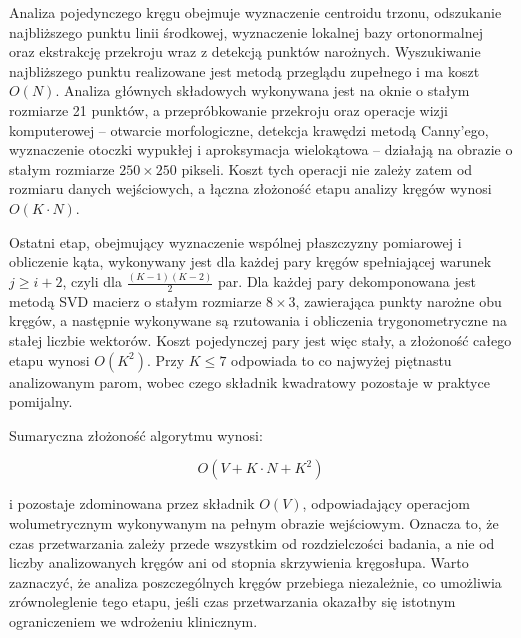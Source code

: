 Analiza pojedynczego kręgu obejmuje wyznaczenie centroidu trzonu, odszukanie najbliższego punktu linii środkowej, wyznaczenie lokalnej bazy ortonormalnej oraz ekstrakcję przekroju wraz z detekcją punktów narożnych.
Wyszukiwanie najbliższego punktu realizowane jest metodą przeglądu zupełnego i ma koszt $O(N)$.
Analiza głównych składowych wykonywana jest na oknie o stałym rozmiarze 21 punktów, a przepróbkowanie przekroju oraz operacje wizji komputerowej -- otwarcie morfologiczne, detekcja krawędzi metodą Canny'ego, wyznaczenie otoczki wypukłej i aproksymacja wielokątowa -- działają na obrazie o stałym rozmiarze $250 \times 250$ pikseli.
Koszt tych operacji nie zależy zatem od rozmiaru danych wejściowych, a łączna złożoność etapu analizy kręgów wynosi $O(K \cdot N)$.

Ostatni etap, obejmujący wyznaczenie wspólnej płaszczyzny pomiarowej i obliczenie kąta, wykonywany jest dla każdej pary kręgów spełniającej warunek $j \geq i+2$, czyli dla $\frac{(K-1)(K-2)}{2}$ par.
Dla każdej pary dekomponowana jest metodą SVD macierz o stałym rozmiarze $8 \times 3$, zawierająca punkty narożne obu kręgów, a następnie wykonywane są rzutowania i obliczenia trygonometryczne na stałej liczbie wektorów.
Koszt pojedynczej pary jest więc stały, a złożoność całego etapu wynosi $O(K^2)$.
Przy $K \leq 7$ odpowiada to co najwyżej piętnastu analizowanym parom, wobec czego składnik kwadratowy pozostaje w praktyce pomijalny.

Sumaryczna złożoność algorytmu wynosi:

\begin{equation} \label{eq:zlozonosc-skolioza}
    O(V + K \cdot N + K^2)
\end{equation}

i pozostaje zdominowana przez składnik $O(V)$, odpowiadający operacjom wolumetrycznym wykonywanym na pełnym obrazie wejściowym.
Oznacza to, że czas przetwarzania zależy przede wszystkim od rozdzielczości badania, a nie od liczby analizowanych kręgów ani od stopnia skrzywienia kręgosłupa.
Warto zaznaczyć, że analiza poszczególnych kręgów przebiega niezależnie, co umożliwia zrównoleglenie tego etapu, jeśli czas przetwarzania okazałby się istotnym ograniczeniem we wdrożeniu klinicznym.
